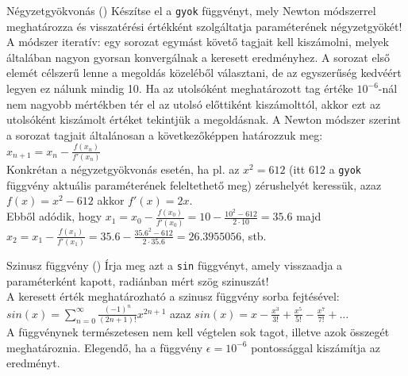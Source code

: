 \begin{frame}
    \begin{exampleblock}{Négyzetgyökvonás ()}
        \small
        Készítse el a \texttt{gyok} függvényt, mely Newton módszerrel meghatározza és visszatérési értékként szolgáltatja paraméterének négyzetgyökét! \\
        A módszer iteratív: egy sorozat egymást követő tagjait kell kiszámolni, melyek általában nagyon gyorsan konvergálnak a keresett eredményhez. A sorozat első elemét célszerű lenne a megoldás közeléből választani, de az egyszerűség kedvéért legyen ez nálunk mindig 10. Ha az utolsóként meghatározott tag értéke \( 10^{-6} \)-nál nem nagyobb mértékben tér el az utolsó előttiként kiszámolttól, akkor ezt az utolsóként kiszámolt értéket tekintjük a megoldásnak. A Newton módszer szerint a sorozat tagjait általánosan a következőképpen határozzuk meg: \( x_{n+1} = x_n - \frac{f(x_n)}{f'(x_n)} \) \\
        Konkrétan a négyzetgyökvonás esetén, ha pl. az \( x^2 = 612 \) (itt 612 a \texttt{gyok} függvény aktuális paraméterének feleltethető meg) zérushelyét keressük, azaz \( f(x) = x^2 - 612 \) akkor \( f'(x) = 2x \). \\
        Ebből adódik, hogy \( x_1 = x_0 - \frac{f(x_0)}{f'(x_0)} = 10 - \frac{10^2 - 612}{2 \cdot 10} = 35.6 \) majd \( x_2 = x_1 - \frac{f(x_1)}{f'(x_1)} = 35.6 - \frac{35.6^2 - 612}{2 \cdot 35.6} = 26.3955056 \), stb.
    \end{exampleblock}
\end{frame}

\begin{frame}
    \begin{exampleblock}{Szinusz függvény ()}
        Írja meg azt a \texttt{sin} függvényt, amely visszaadja a paraméterként kapott, radiánban mért szög szinuszát!\\
        \smallskip
        A keresett érték meghatározható a szinusz függvény sorba fejtésével: \( sin(x) = \sum_{n=0}^\infty \frac{(-1)^n}{(2n+1)!} x^{2n+1} \) azaz \( sin(x) = x-\frac{x^3}{3!}+\frac{x^5}{5!}-\frac{x^7}{7!}+\dots \)\\
        \smallskip
        A függvénynek természetesen nem kell végtelen sok tagot, illetve azok összegét meghatároznia. Elegendő, ha a függvény \( \epsilon = 10^{-6} \) pontossággal kiszámítja az eredményt.
    \end{exampleblock}
\end{frame}

